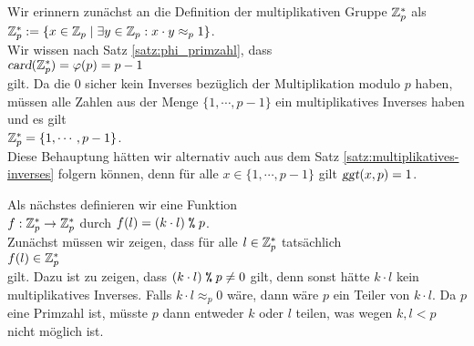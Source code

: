 \proof
Wir erinnern zunächst an die Definition der multiplikativen Gruppe $\mathbb{Z}_{p}^*$ als
\\[0.2cm]
\hspace*{1.3cm}
$\mathbb{Z}_{p}^* := \{ x \in \mathbb{Z}_{p} \mid \exists y \in \mathbb{Z}_{p} : x \cdot y \approx_p 1 \}$.
\\[0.2cm]
Wir wissen nach Satz \ref{satz:phi_primzahl}, dass 
\\[0.2cm]
\hspace*{1.3cm}
$\textsl{card}(\mathbb{Z}_{p}^*) = \varphi(p) = p - 1$
\\[0.2cm]
gilt.  Da die $0$ sicher kein Inverses bezüglich der Multiplikation modulo $p$
haben, müssen alle Zahlen aus der Menge $\{1, \cdots, p-1\}$ ein multiplikatives Inverses haben und
es gilt
\\[0.2cm]
\hspace*{1.3cm}
$\mathbb{Z}_{p}^* = \{ 1, \cdots, p - 1\}$.
\\[0.2cm]
Diese Behauptung hätten wir alternativ auch aus dem Satz \ref{satz:multiplikatives-inverses} folgern
können, denn für alle $x \in \{ 1, \cdots, p-1\}$ gilt $\textsl{ggt}(x, p) = 1$.

Als nächstes definieren wir  eine Funktion
\\[0.2cm]
\hspace*{1.3cm}
$f: \mathbb{Z}_{p}^* \rightarrow \mathbb{Z}_{p}^*$ \quad durch \quad $f(l) = (k \cdot l) \;\texttt{\%}\; p$.
\\[0.2cm]
Zunächst müssen wir zeigen, dass für alle $l \in \mathbb{Z}_{p}^*$ tatsächlich 
\\[0.2cm]
\hspace*{1.3cm}
$f(l) \in \mathbb{Z}_{p}^*$
\\[0.2cm]
gilt.  Dazu ist zu zeigen, dass $(k \cdot l) \;\texttt{\%}\; p \not= 0$ gilt, denn sonst hätte $k \cdot l$
kein multiplikatives Inverses.  Falls $k \cdot l \approx_p 0$ wäre, dann wäre $p$ ein Teiler von $k \cdot l$.
Da $p$ eine Primzahl ist, müsste $p$ dann entweder $k$ oder $l$ teilen, was wegen $k,l < p$ nicht
möglich ist.

